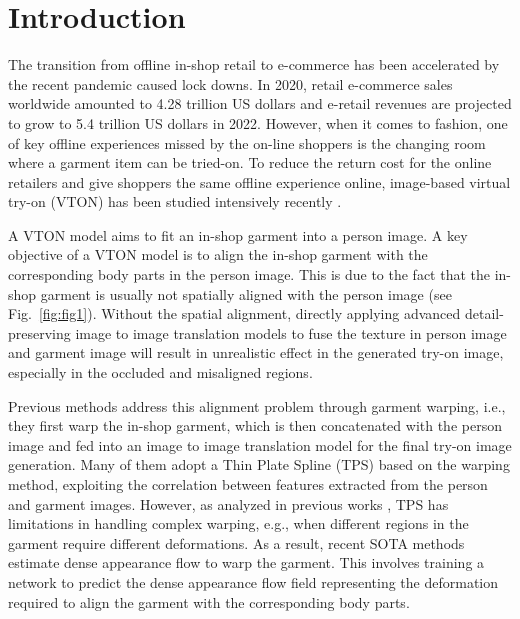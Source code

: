 \documentclass[10pt,twocolumn,letterpaper]{article}
\begin{document}
\section{Introduction}
The transition from offline in-shop retail to e-commerce has been accelerated by the recent pandemic caused lock downs.  In 2020, retail e-commerce sales worldwide amounted to 4.28 trillion US dollars and e-retail revenues are projected to grow to 5.4 trillion US dollars in 2022. However, when it comes to fashion, one of key offline experiences missed by the on-line shoppers is the changing room where a garment item can be tried-on. To reduce the return cost for the online retailers and give shoppers the same offline experience online, image-based virtual try-on (VTON) has been studied intensively recently  \cite{han2018viton,wang2018toward,yu2019vtnfp,yang2020towards,issenhuth2020not,ge2021disentangled, wang2020down, han2019clothflow, ge2021parser, lewis2021tryongan}.


A VTON model aims to  fit an in-shop garment into a person image. 
A key objective of a VTON model is to align the in-shop garment with the corresponding body parts in the person image. This is due to the fact that the in-shop garment is usually not spatially aligned with the person image (see Fig.~\ref{fig:fig1}). Without the  spatial alignment, directly applying advanced detail-preserving image to image translation models \cite{ronneberger2015u, isola2017image} to fuse the texture in person image and garment image will result in unrealistic effect in the generated try-on image, especially in the occluded and misaligned regions.

Previous methods address this alignment problem through garment warping, i.e., they first warp the in-shop garment, which is then concatenated with the person image and fed into an image to image translation model for the final try-on image generation.  Many of them \cite{han2018viton,wang2018toward,yu2019vtnfp,yang2020towards,issenhuth2020not,ge2021disentangled} adopt a Thin Plate Spline (TPS) \cite{duchon1977splines} based on the warping method,  exploiting the correlation between features extracted from the person and garment images. However, as analyzed in previous works \cite{yang2020towards, han2019clothflow,chopra2021zflow}, TPS has limitations in handling complex warping, e.g., when different regions in the garment require different deformations. As a result, recent SOTA methods \cite{han2019clothflow, ge2021parser} estimate dense appearance flow \cite{zhou2016view} to warp the garment. This involves training a network to predict the dense appearance flow field representing the deformation required to align the garment with the corresponding body parts. 
\end{document}
